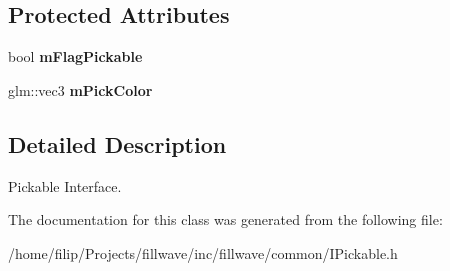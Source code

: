 \subsection*{Protected Attributes}
\begin{DoxyCompactItemize}
\item 
bool {\bfseries m\+Flag\+Pickable}\hypertarget{classflw_1_1flf_1_1IPickable_adec6dd390430db763ad984910d609a97}{}\label{classflw_1_1flf_1_1IPickable_adec6dd390430db763ad984910d609a97}

\item 
glm\+::vec3 {\bfseries m\+Pick\+Color}\hypertarget{classflw_1_1flf_1_1IPickable_a4c5c7fc12317784810dce16a649be2d1}{}\label{classflw_1_1flf_1_1IPickable_a4c5c7fc12317784810dce16a649be2d1}

\end{DoxyCompactItemize}


\subsection{Detailed Description}
Pickable Interface. 

The documentation for this class was generated from the following file\+:\begin{DoxyCompactItemize}
\item 
/home/filip/\+Projects/fillwave/inc/fillwave/common/I\+Pickable.\+h\end{DoxyCompactItemize}
